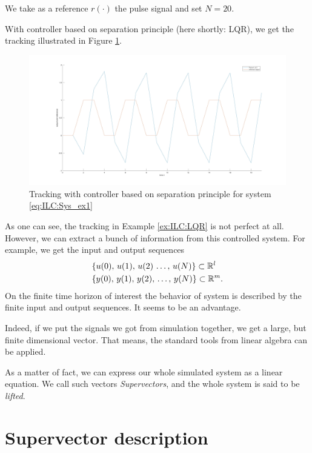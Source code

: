 \begin{exam}
We take as a reference $r(\cdot)$ the pulse signal and set $N = 20$. 

With controller based on separation principle (here shortly: LQR), we get the tracking illustrated in  Figure \ref{img:ILC:LQR_control}.
\begin{figure}[ht]
	\centering
	\includegraphics[width=\textwidth]{fig/LQR_ex.jpg}
	\caption{Tracking with controller based on separation principle for system \eqref{eq:ILC:Sys_ex1}}
	\label{img:ILC:LQR_control}
\end{figure}
\end{exam}



As one can see, the tracking in Example \ref{ex:ILC:LQR} is not perfect at all. However, we can extract a bunch of information from this controlled system. For example, we get the input and output sequences 
\begin{align}
&\{u(0), \, u(1), \,  u(2) \, \dots , \, u(N)\} \subset {\mathbb{R}}^l \label{eq:ILC:u_seq} \\
&\{y(0), \, y(1), \, y(2) , \, \dots , \, y(N)\}\subset {\mathbb{R}}^m.\label{eq:ILC:y_seq}
\end{align}
On the finite time horizon of interest the behavior of system is described by the finite input and output sequences. It seems to be an advantage. 

Indeed, if we put the signals we got from simulation together, we get a large, but finite dimensional vector. That means, the standard tools from linear algebra can be applied. 

As a matter of fact, we can express our whole simulated system as a linear equation. We call such vectors \textit{Supervectors}, and the whole system is said to be \textit{lifted}.

\section{Supervector description} 

